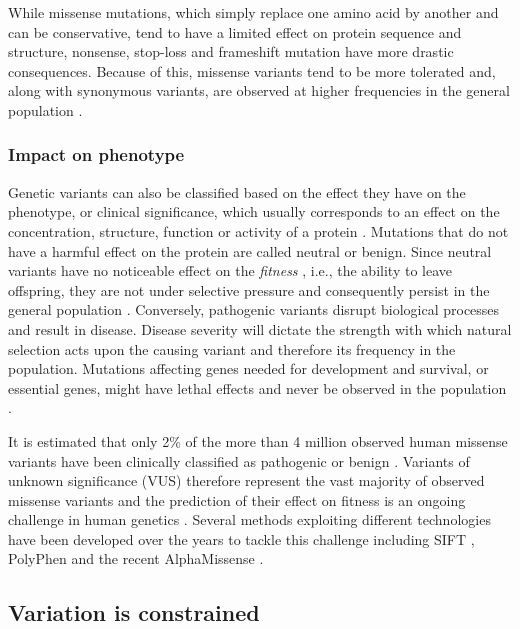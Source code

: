 While missense mutations, which simply replace one amino acid by another and can be conservative, tend to have a limited effect on protein sequence and structure, nonsense, stop-loss and frameshift mutation have more drastic consequences. Because of this, missense variants tend to be more tolerated and, along with synonymous variants, are observed at higher frequencies in the general population \cite{COULTER_2004_MUTATIONS}.

\subsubsection{Impact on phenotype}

Genetic variants can also be classified based on the effect they have on the phenotype, or clinical significance, which usually corresponds to an effect on the concentration, structure, function or activity of a protein \cite{VIHINEN_2022_VARIATION}. Mutations that do not have a harmful effect on the protein are called neutral or benign. Since neutral variants have no noticeable effect on the \textit{fitness} \cite{DARWIN_1859_ORIGIN}, i.e., the ability to leave offspring, they are not under selective pressure and consequently persist in the general population \cite{KIMURA_1968_NEUTRAL}. Conversely, pathogenic variants disrupt biological processes and result in disease. Disease severity will dictate the strength with which natural selection acts upon the causing variant and therefore its frequency in the population. Mutations affecting genes needed for development and survival, or essential genes, might have lethal effects and never be observed in the population \cite{GLUECKSOHN_1963_LETHALITY}.

It is estimated that only 2\% of the more than 4 million observed human missense variants have been clinically classified as pathogenic or benign \cite{LEK_2016_EXAC}. Variants of unknown significance (VUS) therefore represent the vast majority of observed missense variants and the prediction of their effect on fitness is an ongoing challenge in human genetics \cite{MCLAREN_2016_VEP}. Several methods exploiting different technologies have been developed over the years to tackle this challenge including SIFT \cite{KUMAR_2009_SIFT}, PolyPhen \cite{ADZHUBEI_2013_POLYPHEN} and the recent AlphaMissense \cite{CHENG_2023_ALPHAMISSENSE}.

\subsection{Variation is constrained}

